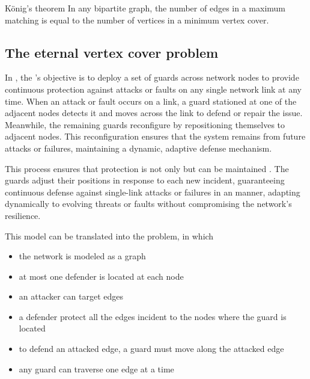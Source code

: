 \documentclass[a4paper, 12pt]{report}
\begin{document}
    \begin{framedthm}{König's theorem}
        In any bipartite graph, the number of edges in a maximum matching is equal to the number of vertices in a minimum vertex cover.
    \end{framedthm}

    \subsection{The eternal vertex cover problem}

    In , the 's objective is to deploy a  set of guards across network nodes to provide continuous protection against attacks or faults on any single network link at any time. When an attack or fault occurs on a link, a guard stationed at one of the adjacent nodes detects it and  moves across the link to defend or repair the issue. Meanwhile, the remaining guards reconfigure by repositioning themselves to adjacent nodes. This reconfiguration ensures that the system remains  from future attacks or failures, maintaining a dynamic, adaptive defense mechanism.

    This process ensures that protection is not only  but can be maintained . The guards adjust their positions in response to each new incident, guaranteeing continuous defense against single-link attacks or failures in an  manner, adapting dynamically to evolving threats or faults without compromising the network's resilience.

    This model can be translated into the  problem, in which

    \begin{itemize}
        \item the network is modeled as a graph
        \item at most one defender is located at each node
        \item an attacker can target edges
        \item a defender  protect all the edges incident to the nodes where the guard is located
        \item to defend an attacked edge, a guard must move along the attacked edge
        \item any guard can traverse one edge at a time
    \end{itemize}
\end{document}
